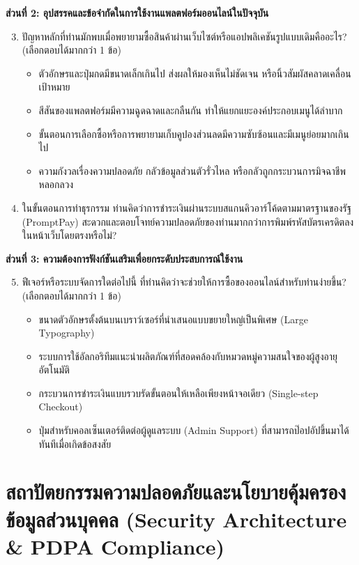 \textbf{ส่วนที่ 2: อุปสรรคและข้อจำกัดในการใช้งานแพลตฟอร์มออนไลน์ในปัจจุบัน}
\begin{enumerate}
    \setcounter{enumi}{2}
    \item ปัญหาหลักที่ท่านมักพบเมื่อพยายามซื้อสินค้าผ่านเว็บไซต์หรือแอปพลิเคชันรูปแบบเดิมคืออะไร? (เลือกตอบได้มากกว่า 1 ข้อ) \cite{accessibility_elderly_2012}
    \begin{itemize}
        \item ตัวอักษรและปุ่มกดมีขนาดเล็กเกินไป ส่งผลให้มองเห็นไม่ชัดเจน หรือนิ้วสัมผัสคลาดเคลื่อนเป้าหมาย
        \item สีสันของแพลตฟอร์มมีความฉูดฉาดและกลืนกัน ทำให้แยกแยะองค์ประกอบเมนูได้ลำบาก
        \item ขั้นตอนการเลือกซื้อหรือการพยายามเก็บคูปองส่วนลดมีความซับซ้อนและมีเมนูย่อยมากเกินไป
        \item ความกังวลเรื่องความปลอดภัย กลัวข้อมูลส่วนตัวรั่วไหล หรือกลัวถูกกระบวนการมิจฉาชีพหลอกลวง
    \end{itemize}
    \item ในขั้นตอนการทำธุรกรรม ท่านคิดว่าการชำระเงินผ่านระบบสแกนคิวอาร์โค้ดตามมาตรฐานของรัฐ (PromptPay) สะดวกและตอบโจทย์ความปลอดภัยของท่านมากกว่าการพิมพ์รหัสบัตรเครดิตลงในหน้าเว็บโดยตรงหรือไม่? \cite{promptpay2021}
\end{enumerate}

\textbf{ส่วนที่ 3: ความต้องการฟังก์ชันเสริมเพื่อยกระดับประสบการณ์ใช้งาน}
\begin{enumerate}
    \setcounter{enumi}{4}
    \item ฟีเจอร์หรือระบบจัดการใดต่อไปนี้ ที่ท่านคิดว่าจะช่วยให้การซื้อของออนไลน์สำหรับท่านง่ายขึ้น? (เลือกตอบได้มากกว่า 1 ข้อ)
    \begin{itemize}
        \item ขนาดตัวอักษรตั้งต้นบนเบราว์เซอร์ที่นำเสนอแบบขยายใหญ่เป็นพิเศษ (Large Typography)
        \item ระบบการใช้อัลกอริทึมแนะนำผลิตภัณฑ์ที่สอดคล้องกับหมวดหมู่ความสนใจของผู้สูงอายุอัตโนมัติ
        \item กระบวนการชำระเงินแบบรวบรัดขั้นตอนให้เหลือเพียงหน้าจอเดียว (Single-step Checkout) \cite{uxtrends2023}
        \item ปุ่มสำหรับคอลเซ็นเตอร์ติดต่อผู้ดูแลระบบ (Admin Support) ที่สามารถป๊อปอัปขึ้นมาได้ทันทีเมื่อเกิดข้อสงสัย
    \end{itemize}
\end{enumerate}

\section{สถาปัตยกรรมความปลอดภัยและนโยบายคุ้มครองข้อมูลส่วนบุคคล (Security Architecture \& PDPA Compliance)}

